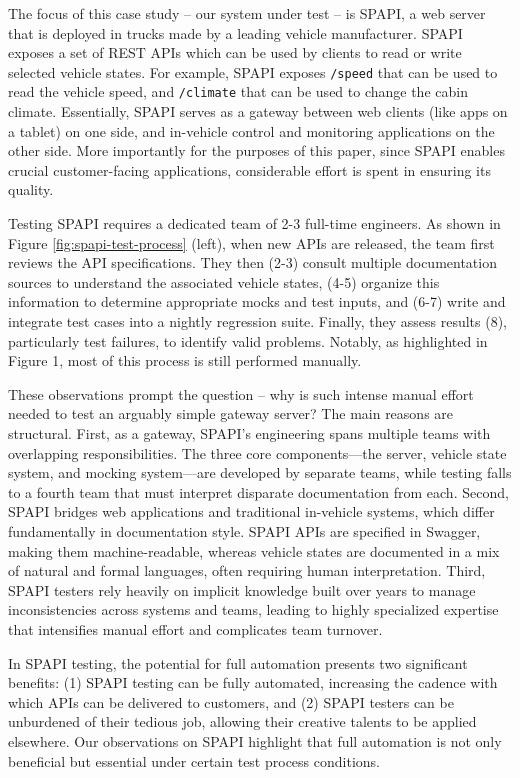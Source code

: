 The focus of this case study -- our system under test -- is SPAPI, a web server that is deployed in trucks made by a leading vehicle manufacturer. SPAPI exposes a set of REST APIs which can be used by clients to read or write selected vehicle states. For example, SPAPI exposes \texttt{/speed} that can be used to read the vehicle speed, and \texttt{/climate} that can be used to change the cabin climate. Essentially, SPAPI serves as a gateway between web clients (like apps on a tablet) on one side, and in-vehicle control and monitoring applications on the other side. More importantly for the purposes of this paper, since SPAPI enables crucial customer-facing applications, considerable effort is spent in ensuring its quality. 

Testing SPAPI requires a dedicated team of 2-3 full-time engineers. As shown in Figure \ref{fig:spapi-test-process} (left), when new APIs are released, the team first reviews the API specifications. They then (2-3) consult multiple documentation sources to understand the associated vehicle states, (4-5) organize this information to determine appropriate mocks and test inputs, and (6-7) write and integrate test cases into a nightly regression suite. Finally, they assess results (8), particularly test failures, to identify valid problems. Notably, as highlighted in Figure 1, most of this process is still performed manually.

These observations prompt the question -- why is such intense manual effort needed to test an arguably simple gateway server? The main reasons are structural. First, as a gateway, SPAPI’s engineering spans multiple teams with overlapping responsibilities. The three core components—the server, vehicle state system, and mocking system—are developed by separate teams, while testing falls to a fourth team that must interpret disparate documentation from each. Second, SPAPI bridges web applications and traditional in-vehicle systems, which differ fundamentally in documentation style. SPAPI APIs are specified in Swagger, making them machine-readable, whereas vehicle states are documented in a mix of natural and formal languages, often requiring human interpretation. Third, SPAPI testers rely heavily on implicit knowledge built over years to manage inconsistencies across systems and teams, leading to highly specialized expertise that intensifies manual effort and complicates team turnover.

In SPAPI testing, the potential for full automation presents two significant benefits: (1) SPAPI testing can be fully automated, increasing the cadence with which APIs can be delivered to customers, and (2) SPAPI testers can be unburdened of their tedious job, allowing their creative talents to be applied elsewhere. Our observations on SPAPI highlight that full automation is not only beneficial but essential under certain test process conditions. 

